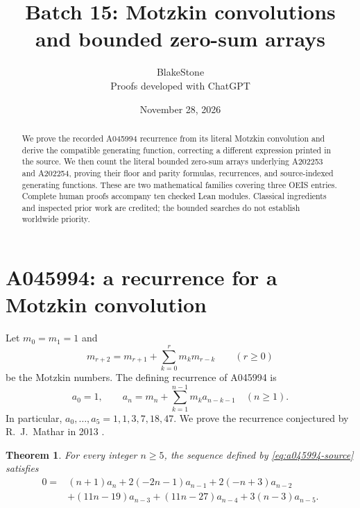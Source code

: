\documentclass[11pt]{article}
\title{Batch 15: Motzkin convolutions and bounded zero-sum arrays}
\author{BlakeStone\\\small Proofs developed with ChatGPT}
\date{November 28, 2026}
\newtheorem{theorem}{Theorem}[section]
\begin{document}
\maketitle
\begin{abstract}
We prove the recorded A045994 recurrence from its literal Motzkin
convolution and derive the compatible generating function, correcting a
different expression printed in the source. We then count the literal
bounded zero-sum arrays underlying A202253 and A202254, proving their
floor and parity formulas, recurrences, and source-indexed generating
functions. These are two mathematical families covering three OEIS
entries. Complete human proofs accompany ten checked Lean modules.
Classical ingredients and inspected prior work are credited; the bounded
searches do not establish worldwide priority.
\end{abstract}

\section{A045994: a recurrence for a Motzkin convolution}

Let $m_0=m_1=1$ and
\[
 m_{r+2}=m_{r+1}+\sum_{k=0}^{r}m_km_{r-k}\qquad(r\ge0)
\]
be the Motzkin numbers. The defining recurrence of A045994 is
\begin{equation}\label{eq:a045994-source}
 a_0=1,\qquad
 a_n=m_n+\sum_{k=1}^{n-1}m_ka_{n-k-1}\quad(n\ge1).
\end{equation}
In particular, $a_0,\ldots,a_5=1,1,3,7,18,47$.
We prove the recurrence conjectured by R.~J.~Mathar in 2013
\cite{a045994-source}.

\begin{theorem}\label{thm:a045994}
For every integer $n\ge5$, the sequence defined by
\eqref{eq:a045994-source} satisfies
\[
\begin{aligned}
0={}&(n+1)a_n+2(-2n-1)a_{n-1}+2(-n+3)a_{n-2}\\
 &+(11n-19)a_{n-3}+(11n-27)a_{n-4}+3(n-3)a_{n-5}.
\end{aligned}
\]
\end{theorem}
\end{document}
